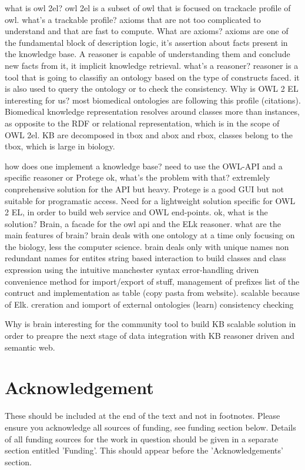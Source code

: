 \documentclass{bioinfo}
\begin{document}
what is owl 2el?
owl 2el is a subset of owl that is focused on trackacle profile of owl.
what's a trackable profile?
axioms that are not too complicated to understand and that are fast to compute.
What are axioms?
axioms are one of the fundamental block of description logic, it's assertion about facts present in the knowledge base. A reasoner
is capable of understanding them and conclude new facts from it, it implicit knowledge retrieval.
what's a reasoner?
reasoner is a tool that is going to classifiy an ontology based on the type of constructs faced. it is also used to query the ontology or to
check the consistency.
Why is OWL 2 EL interesting for us?
most biomedical ontologies are following this profile (citations).
Biomedical knowledge representation resolves around classes more than instances, as opposite to the RDF or relational representation,
which is in the scope of OWL 2el.
KB are decomposed in tbox and abox and rbox, classes belong to the tbox, which is large in biology.

how does one implement a knowledge base?
need to use the OWL-API and a specific reasoner or Protege
ok, what's the problem with that?
extremlely conprehensive solution for the API but heavy. Protege is a good GUI but not suitable for programatic access.
Need for a lightweight solution specific for OWL 2 EL, in order to build web service and OWL end-points.
ok, what is the solution?
Brain, a facade for the owl api and the ELk reasoner.
what are the main features of brain?
brain deals with one ontology at a time only
focusing on the biology, less the computer science.
brain deals only with unique names non redundant names for entites
string based interaction to build classes and class expression using the intuitive manchester syntax
error-handling driven
convenience method for import/export of stuff, management of prefixes
list of the contruct and implementation as table (copy pasta from website).
scalable because of Elk.
creration and iomport of external ontologies (learn)
consistency checking

Why is brain interesting for the community
tool to build KB scalable solution in order to preapre the next stage of data integration with KB reasoner driven and semantic web.

\section*{Acknowledgement}
These should be included at the end of the text and not in footnotes. Please ensure you acknowledge all 
sources of funding, see funding section below.
Details of all funding sources for the work in question should be given 
in a separate section entitled 'Funding'. This should appear before the 'Acknowledgements' section.
\end{document}
